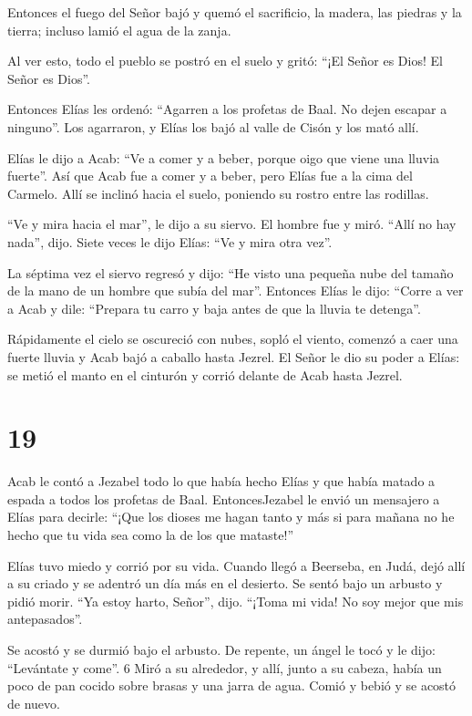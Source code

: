  Entonces el fuego del Señor bajó y quemó el sacrificio, la
madera, las piedras y la tierra; incluso lamió el agua de la zanja.

 Al ver esto, todo el pueblo se postró en el suelo y gritó:
``¡El Señor es Dios! El Señor es Dios''.

 Entonces Elías les ordenó: ``Agarren a los profetas de
Baal. No dejen escapar a ninguno''. Los agarraron, y Elías los bajó al
valle de Cisón y los mató allí.

 Elías le dijo a Acab: ``Ve a comer y a beber, porque oigo
que viene una lluvia fuerte''.  Así que Acab fue a comer y
a beber, pero Elías fue a la cima del Carmelo. Allí se inclinó hacia el
suelo, poniendo su rostro entre las rodillas.

 ``Ve y mira hacia el mar'', le dijo a su siervo. El hombre
fue y miró. ``Allí no hay nada'', dijo. Siete veces le dijo Elías: ``Ve
y mira otra vez''.

 La séptima vez el siervo regresó y dijo: ``He visto una
pequeña nube del tamaño de la mano de un hombre que subía del mar''.
Entonces Elías le dijo: ``Corre a ver a Acab y dile: ``Prepara tu carro
y baja antes de que la lluvia te detenga''.

 Rápidamente el cielo se oscureció con nubes, sopló el
viento, comenzó a caer una fuerte lluvia y Acab bajó a caballo hasta
Jezrel.  El Señor le dio su poder a Elías: se metió el
manto en el cinturón y corrió delante de Acab hasta Jezrel.

\hypertarget{section-18}{%
\section{19}\label{section-18}}

 Acab le contó a Jezabel todo lo que había hecho Elías y que
había matado a espada a todos los profetas de Baal. 
EntoncesJezabel le envió un mensajero a Elías para decirle: ``¡Que los
dioses me hagan tanto y más si para mañana no he hecho que tu vida sea
como la de los que mataste!''

 Elías tuvo miedo y corrió por su vida. Cuando llegó a
Beerseba, en Judá, dejó allí a su criado  y se adentró un
día más en el desierto. Se sentó bajo un arbusto y pidió morir. ``Ya
estoy harto, Señor'', dijo. ``¡Toma mi vida! No soy mejor que mis
antepasados''.

 Se acostó y se durmió bajo el arbusto. De repente, un ángel
le tocó y le dijo: ``Levántate y come''. 6 Miró a su alrededor, y allí,
junto a su cabeza, había un poco de pan cocido sobre brasas y una jarra
de agua. Comió y bebió y se acostó de nuevo.

